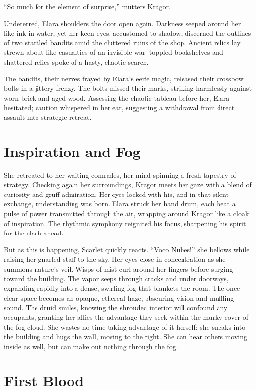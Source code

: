 \documentclass[
  letterpaper,12pt,twoside,twocolumn,openany,
  nodeprecatedcode,bg=full]{dndbook}
\begin{document}
``So much for the element of surprise,'' mutters Kragor.

Undeterred, Elara shoulders the door open again. Darkness seeped around
her like ink in water, yet her keen eyes, accustomed to shadow,
discerned the outlines of two startled bandits amid the cluttered ruins
of the shop. Ancient relics lay strewn about like casualties of an
invisible war; toppled bookshelves and shattered relics spoke of a
hasty, chaotic search.

The bandits, their nerves frayed by Elara's eerie magic, released their
crossbow bolts in a jittery frenzy. The bolts missed their marks,
striking harmlessly against worn brick and aged wood. Assessing the
chaotic tableau before her, Elara hesitated; caution whispered in her
ear, suggesting a withdrawal from direct assault into strategic retreat.

\section{Inspiration and Fog}\label{inspiration-and-fog}

She retreated to her waiting comrades, her mind spinning a fresh
tapestry of strategy. Checking again her surroundings, Kragor meets her
gaze with a blend of curiosity and gruff admiration. Her eyes locked
with his, and in that silent exchange, understanding was born. Elara
struck her hand drum, each beat a pulse of power transmitted through the
air, wrapping around Kragor like a cloak of inspiration. The rhythmic
symphony reignited his focus, sharpening his spirit for the clash ahead.

But as this is happening, Scarlet quickly reacts. ``Voco Nubes!'' she
bellows while raising her gnarled staff to the sky. Her eyes close in
concentration as she summons nature's veil. Wisps of mist curl around
her fingers before surging toward the building. The vapor seeps through
cracks and under doorways, expanding rapidly into a dense, swirling fog
that blankets the room. The once-clear space becomes an opaque, ethereal
haze, obscuring vision and muffling sound. The druid smiles, knowing the
shrouded interior will confound any occupants, granting her allies the
advantage they seek within the murky cover of the fog cloud. She wastes
no time taking advantage of it herself: she sneaks into the building and
hugs the wall, moving to the right. She can hear others moving inside as
well, but can make out nothing through the fog.

\section{First Blood}\label{first-blood}
\end{document}
